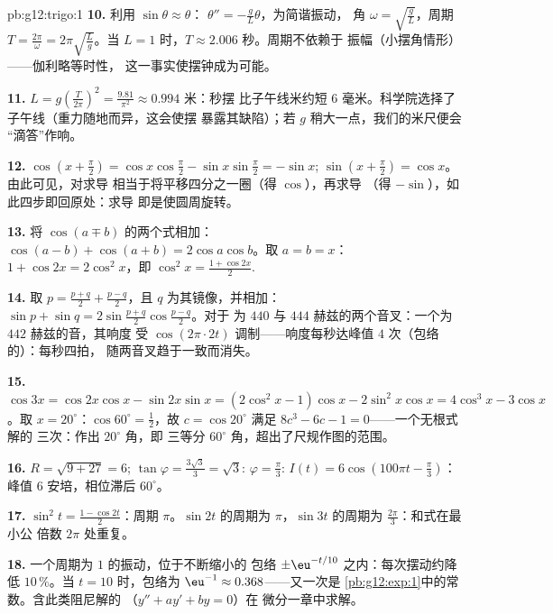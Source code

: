 \begin{solution}{pb:g12:trigo:1}
\textbf{10.} 利用 $\sin\theta \approx \theta$：
$\theta'' = -\frac gL \theta$，为简谐振动，
角 $\omega = \sqrt{\frac gL}$，周期
$T = \frac{2\pi}{\omega} = 2\pi\sqrt{\frac Lg}$。当
$L = 1$ 时，$T \approx 2.006$ 秒。周期不依赖于
振幅（小摆角情形）——伽利略等时性，
这一事实使摆钟成为可能。

\textbf{11.} $L = g\left(\frac{T}{2\pi}\right)^2 =
\frac{9.81}{\pi^2} \approx 0.994$ 米：秒摆
比子午线米约短 $6$ 毫米。科学院选择了
子午线（重力随地而异，这会使摆
暴露其缺陷）；若 $g$ 稍大一点，我们的米尺便会
“滴答”作响。

\textbf{12.} $\cos\left(x + \frac\pi2\right) =
\cos x \cos\frac\pi2 - \sin x \sin\frac\pi2 = -\sin x$;
$\sin\left(x + \frac\pi2\right) = \cos x$。由此可见，对求导
相当于将平移四分之一圈（得 $\cos$），再求导
（得 $-\sin$），如此四步即回原处：求导
即是使圆周旋转。

\textbf{13.} 将 $\cos(a \mp b)$ 的两个式相加：
$\cos(a-b) + \cos(a+b) = 2\cos a\cos b$。取 $a = b = x$：
$1 + \cos 2x = 2\cos^2 x$，即
$\cos^2 x = \frac{1 + \cos 2x}{2}$.

\textbf{14.} 取 $p = \frac{p+q}{2} + \frac{p-q}{2}$，且
$q$ 为其镜像，并相加：
$\sin p + \sin q = 2\sin\frac{p+q}{2}\cos\frac{p-q}{2}$。对于
为 $440$ 与 $444$ 赫兹的两个音叉：一个为 $442$ 赫兹的音，其响度
受 $\cos(2\pi \cdot 2t)$ 调制——响度每秒达峰值 $4$
次（包络的）：每秒四拍，
随两音叉趋于一致而消失。

\textbf{15.} $\cos 3x = \cos 2x\cos x - \sin 2x \sin x =
(2\cos^2 x - 1)\cos x - 2\sin^2 x\cos x = 4\cos^3 x -
3\cos x$。取 $x = 20^\circ$：$\cos 60^\circ = \frac12$，故
$c = \cos 20^\circ$ 满足 $8c^3 - 6c - 1 = 0$——一个无根式解的
三次：作出 $20^\circ$ 角，即
三等分 $60^\circ$ 角，超出了尺规作图的范围。

\textbf{16.} $R = \sqrt{9 + 27} = 6$;
$\tan\varphi = \frac{3\sqrt3}{3} = \sqrt3$:
$\varphi = \frac\pi3$: $I(t) = 6\cos\left(100\pi t -
\frac\pi3\right)$：峰值 $6$ 安培，相位滞后 $60^\circ$。

\textbf{17.} $\sin^2 t = \frac{1 - \cos 2t}{2}$：周期
$\pi$。$\sin 2t$ 的周期为 $\pi$，$\sin 3t$ 的周期为
$\frac{2\pi}{3}$：和式在最小公
倍数 $2\pi$ 处重复。

\textbf{18.} 一个周期为 $1$ 的振动，位于不断缩小的
包络 $\pm\eu^{-t/10}$ 之内：每次摆动约降低 $10\,\%$。当
$t = 10$ 时，包络为 $\eu^{-1} \approx 0.368$——又一次是
\cref{pb:g12:exp:1}中的常数。含此类阻尼解的
（$y'' + a y' + b y = 0$）在
微分一章中求解。


\end{solution}
